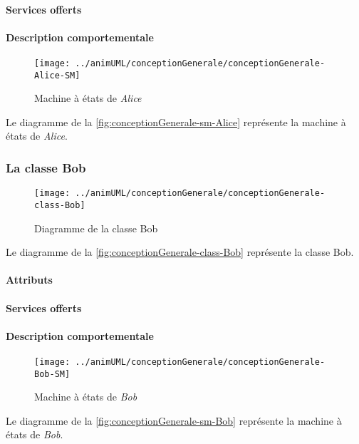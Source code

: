 \paragraph{Services offerts}
\classAliceOperations
\paragraph{Description comportementale}
\begin{figure}[H]
	\centering
	\texttt{[image: ../animUML/conceptionGenerale/conceptionGenerale-Alice-SM]}
	\caption{Machine à états de \emph{Alice}}
	\label{fig:conceptionGenerale-sm-Alice}
\end{figure}
Le diagramme de la \autoref{fig:conceptionGenerale-sm-Alice} représente la machine à états de \emph{Alice}.

\subsubsection{La classe Bob}

\begin{figure}[H]
	\centering
	\texttt{[image: ../animUML/conceptionGenerale/conceptionGenerale-class-Bob]}
	\caption{Diagramme de la classe Bob}
	\label{fig:conceptionGenerale-class-Bob}
\end{figure}
Le diagramme de la \autoref{fig:conceptionGenerale-class-Bob} représente la classe Bob.


\paragraph{Attributs}
\classBobProperties
\paragraph{Services offerts}
\classBobOperations
\paragraph{Description comportementale}
\begin{figure}[H]
	\centering
	\texttt{[image: ../animUML/conceptionGenerale/conceptionGenerale-Bob-SM]}
	\caption{Machine à états de \emph{Bob}}
	\label{fig:conceptionGenerale-sm-Bob}
\end{figure}
Le diagramme de la \autoref{fig:conceptionGenerale-sm-Bob} représente la machine à états de \emph{Bob}.

